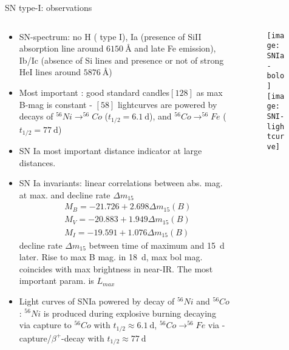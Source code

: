 \begin{frame}{SN type-I: observations} 
\begin{columns}[T]
	\begin{column}{0.5\textwidth}
		\begin{itemize}
			\item SN-spectrum: no H ( type I), Ia (presence of SiII absorption line around $\SI{6150}{\angstrom}$ and late Fe emission), Ib/Ic (absence of Si lines and presence or not of strong HeI lines around $\SI{5876}{\angstrom}$)
			\item Most important : good standard candles$[128]$ as max B-mag is constant - $[58]$ lightcurves are powered by decays of $^{56}Ni\to ^{56}Co$ ($t_{1/2}=\SI{6.1}{\day}$), and $^{56}Co\to^{56}Fe$ ($t_{1/2}=\SI{77}{\day}$) 
            \item SN Ia most important distance indicator at large distances.
            \item SN Ia invariants: linear correlations between abs. mag. at max. and decline rate $\Delta m _{15}$
                \begin{align*}
                    &M_B=-21.726 +2.698\Delta m_{15}(B)\\
                    &M_V=-20.883+1.949\Delta m_{15}(B)\\
                    &M_I=-19.591+1.076\Delta m_{15}(B)
                \end{align*}
                decline rate $\Delta m_{15}$ between time of maximum and \SI{15}{\day} later. Rise to max B mag. in \SI{18}{\day}, max bol mag. coincides with max brightness in near-IR. The most important param. is $L_{max}$
            \item Light curves of SNIa powered by decay of $^{56}Ni$ and $^{56}Co$: $^{56}Ni$ is produced during explosive burning decaying via \Pelectron capture to $^{56}Co$ with $t_{1/2}\approx\SI{6.1}{\day}$, $^{56}Co\to^{56}Fe$ via \Pelectron-capture/$\beta^+$-decay with $t_{1/2}\approx\SI{77}{\day}$
        \end{itemize}
	\end{column}
	\begin{column}{0.5\textwidth}
		\begin{figure}[!ht]
		\texttt{[image: SNIa-bolo]}\label{fig:SNIa-bolo}
			\texttt{[image: SNI-lightcurve]}\label{fig:SNI-lightcurve}
		\end{figure}
\end{column}\end{columns}
\end{frame}

